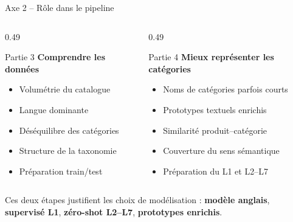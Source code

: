 \documentclass[11pt,aspectratio=169]{beamer}
\newcommand{\key}[1]{\textcolor{mainblue}{\textbf{#1}}}
\begin{document}
\begin{frame}{Axe 2 -- Rôle dans le pipeline}
\small
\begin{columns}
\begin{column}{0.49\textwidth}
\begin{block}{Partie 3}
\centering
\textbf{Comprendre les données}
\end{block}

\begin{itemize}
    \item Volumétrie du catalogue
    \item Langue dominante
    \item Déséquilibre des catégories
    \item Structure de la taxonomie
    \item Préparation train/test
\end{itemize}
\end{column}

\begin{column}{0.49\textwidth}
\begin{block}{Partie 4}
\centering
\textbf{Mieux représenter les catégories}
\end{block}

\begin{itemize}
    \item Noms de catégories parfois courts
    \item Prototypes textuels enrichis
    \item Similarité produit--catégorie
    \item Couverture du sens sémantique
    \item Préparation du L1 et L2--L7
\end{itemize}
\end{column}
\end{columns}

\vspace{0.25cm}

\begin{takeawaybox}
\centering
Ces deux étapes justifient les choix de modélisation : \key{modèle anglais}, \key{supervisé L1}, \key{zéro-shot L2--L7}, \key{prototypes enrichis}.
\end{takeawaybox}
\end{frame}
\end{document}
